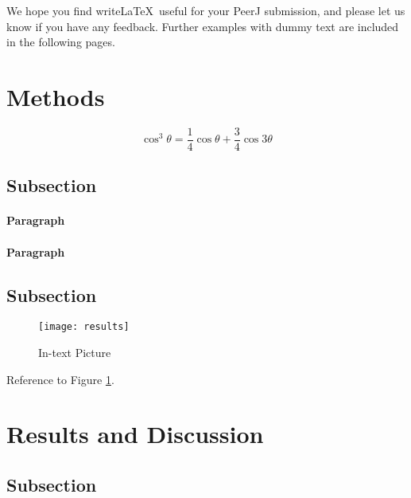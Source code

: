 \documentclass[fleqn,10pt,lineno]{wlpeerj} %
\begin{document}
We hope you find write\LaTeX\ useful for your PeerJ submission, and please let us know if you have any feedback. Further examples with dummy text are included in the following pages.

\section*{Methods}

\lipsum[4] %

\begin{equation}
\cos^3 \theta =\frac{1}{4}\cos\theta+\frac{3}{4}\cos 3\theta
\label{eq:refname2}
\end{equation}

\lipsum[5] %

\subsection*{Subsection}

\lipsum[6] %

\paragraph{Paragraph} \lipsum[7] %
\paragraph{Paragraph} \lipsum[8] %

\subsection*{Subsection}

\lipsum[9] %

\begin{figure}[ht]\centering
\texttt{[image: results]}
\caption{In-text Picture}
\label{fig:results}
\end{figure}

Reference to Figure \ref{fig:results}.

\section*{Results and Discussion}

\lipsum[10] %

\subsection*{Subsection}
\end{document}

